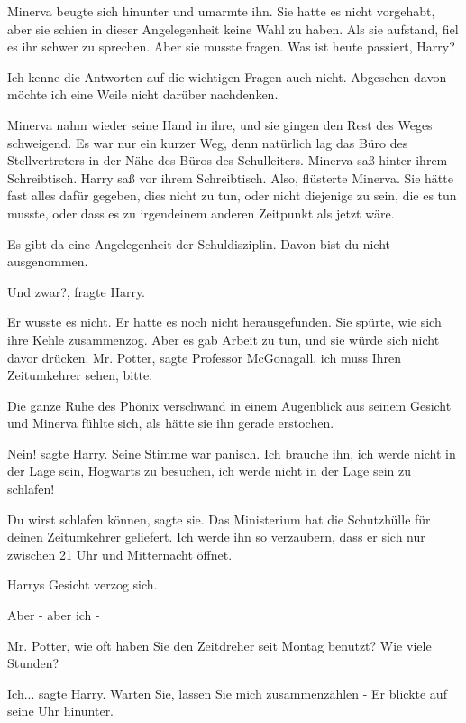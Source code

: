 Minerva beugte sich hinunter und umarmte ihn. Sie hatte es nicht vorgehabt, aber
sie schien in dieser Angelegenheit keine Wahl zu haben. Als sie aufstand, fiel
es ihr schwer zu sprechen. Aber sie musste fragen. \glqq Was ist heute passiert,
Harry?\grqq{}

\glqq Ich kenne die Antworten auf die wichtigen Fragen auch nicht. Abgesehen
davon möchte ich eine Weile nicht darüber nachdenken.\grqq{}

Minerva nahm wieder seine Hand in ihre, und sie gingen den Rest des Weges
schweigend. Es war nur ein kurzer Weg, denn natürlich lag das Büro des
Stellvertreters in der Nähe des Büros des Schulleiters. Minerva saß hinter ihrem
Schreibtisch. Harry saß vor ihrem Schreibtisch. \glqq Also\grqq{}, flüsterte
Minerva. Sie hätte fast alles dafür gegeben, dies nicht zu tun, oder nicht
diejenige zu sein, die es tun musste, oder dass es zu irgendeinem anderen
Zeitpunkt als jetzt wäre.

\glqq Es gibt da eine Angelegenheit der Schuldisziplin. Davon bist du nicht
ausgenommen.\grqq{}

\glqq Und zwar?\grqq{}, fragte Harry.

Er wusste es nicht. Er hatte es noch nicht herausgefunden. Sie spürte, wie sich
ihre Kehle zusammenzog. Aber es gab Arbeit zu tun, und sie würde sich nicht
davor drücken. \glqq Mr. Potter\grqq{}, sagte Professor McGonagall, \glqq ich
muss Ihren Zeitumkehrer sehen, bitte.\grqq{}

Die ganze Ruhe des Phönix verschwand in einem Augenblick aus seinem Gesicht und
Minerva fühlte sich, als hätte sie ihn gerade erstochen.

\glqq Nein!\grqq{} sagte Harry. Seine Stimme war panisch. \glqq Ich brauche ihn,
ich werde nicht in der Lage sein, Hogwarts zu besuchen, ich werde nicht in der
Lage sein zu schlafen!\grqq{}

\glqq Du wirst schlafen können\grqq{}, sagte sie. \glqq Das Ministerium hat die
Schutzhülle für deinen Zeitumkehrer geliefert. Ich werde ihn so verzaubern, dass
er sich nur zwischen 21 Uhr und Mitternacht öffnet.\grqq{}

Harrys Gesicht verzog sich.

\glqq Aber - aber ich -\grqq{}

\glqq Mr. Potter, wie oft haben Sie den Zeitdreher seit Montag benutzt? Wie
viele Stunden?\grqq{}

\glqq Ich...\grqq{} sagte Harry. \glqq Warten Sie, lassen Sie mich
zusammenzählen -\grqq{} Er blickte auf seine Uhr hinunter.

